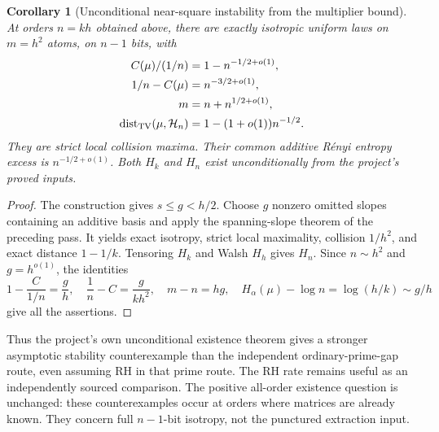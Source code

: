 \documentclass[11pt]{article}
\newtheorem{corollary}[theorem]{Corollary}
\begin{document}
\begin{corollary}[Unconditional near-square instability from the multiplier bound]
\label{cor:stability-project-rate}
At orders $n=kh$ obtained above, there are exactly isotropic uniform
laws on $m=h^2$ atoms, on $n-1$ bits, with
\[
 \begin{split}
 C(\mu)/(1/n)&=1-n^{-1/2+o(1)},\\
 1/n-C(\mu)&=n^{-3/2+o(1)},\\
 m&=n+n^{1/2+o(1)},\\
 \operatorname{dist}_{\rm TV}(\mu,\mathcal H_n)
       &=1-(1+o(1))n^{-1/2}.
 \end{split}
\]
They are strict local collision maxima. Their common additive
R\'enyi entropy excess is $n^{-1/2+o(1)}$.
Both $H_k$ and $H_n$ exist unconditionally from the project's
proved inputs.
\end{corollary}
\begin{proof}
The construction gives $s\le g<h/2$. Choose $g$ nonzero omitted
slopes containing an additive basis and apply the spanning-slope
theorem of the preceding pass. It yields exact isotropy, strict
local maximality, collision $1/h^2$, and exact distance $1-1/k$.
Tensoring $H_k$ and Walsh $H_h$ gives $H_n$.
Since $n\sim h^2$ and $g=h^{o(1)}$, the identities
\[
 1-\frac{C}{1/n}=\frac gh,\quad
 \frac1n-C=\frac{g}{kh^2},\quad
 m-n=hg,\quad
 H_\alpha(\mu)-\log n=\log(h/k)\sim g/h
\]
give all the assertions.
\end{proof}

Thus the project's own unconditional existence theorem gives a
stronger asymptotic stability counterexample than the independent
ordinary-prime-gap route, even assuming RH in that prime route.
The RH rate remains useful as an independently sourced comparison.
The positive all-order existence question is unchanged: these
counterexamples occur at orders where matrices are already known.
They concern full $n-1$-bit isotropy, not the punctured extraction input.
\end{document}
